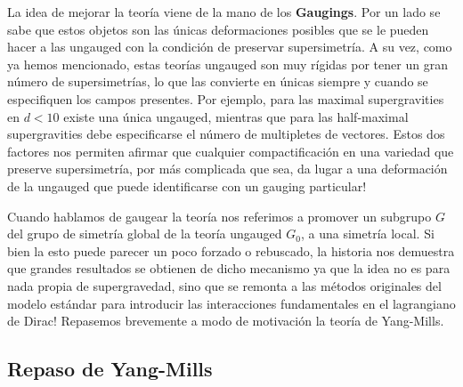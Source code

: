 \documentclass{article}
\numberwithin{equation}{section}
\begin{document}
La idea de mejorar la teoría viene de la mano de los \textbf{Gaugings}. Por un lado se sabe que estos objetos son las únicas deformaciones posibles que se le pueden hacer a las ungauged con la condición de preservar supersimetría. 
A su vez, como ya hemos mencionado, estas teorías ungauged son muy rígidas por tener un gran número de supersimetrías, lo que las convierte en únicas siempre y cuando se especifiquen los campos presentes. Por ejemplo, para las maximal supergravities en $ d<10 $ existe una única ungauged, mientras que para las half-maximal supergravities debe especificarse el número de multipletes de vectores.
Estos dos factores nos permiten afirmar que cualquier compactificación en una variedad que preserve supersimetría, por más complicada que sea, da lugar a una deformación de la ungauged que puede identificarse con un gauging particular!

Cuando hablamos de gaugear la teoría nos referimos a promover un subgrupo $ G $ del grupo de simetría global de la teoría ungauged $ G_0 $, a una simetría local. Si bien la esto puede parecer un poco forzado o rebuscado, la historia nos demuestra que grandes resultados se obtienen de dicho mecanismo ya que la idea no es para nada propia de supergravedad, sino que se remonta a las métodos originales del modelo estándar para introducir las interacciones fundamentales en el lagrangiano de Dirac! Repasemos brevemente a modo de motivación la teoría de Yang-Mills.


\subsection{Repaso de Yang-Mills}
\end{document}
